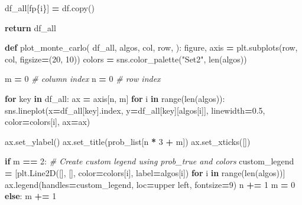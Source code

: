 \documentclass[
]{book}
\newenvironment{Shaded}{\begin{snugshade}}{\end{snugshade}}
\newcommand{\BuiltInTok}[1]{#1}
\newcommand{\CommentTok}[1]{\textcolor[rgb]{0.56,0.35,0.01}{\textit{#1}}}
\newcommand{\ControlFlowTok}[1]{\textcolor[rgb]{0.13,0.29,0.53}{\textbf{#1}}}
\newcommand{\DecValTok}[1]{\textcolor[rgb]{0.00,0.00,0.81}{#1}}
\newcommand{\FloatTok}[1]{\textcolor[rgb]{0.00,0.00,0.81}{#1}}
\newcommand{\KeywordTok}[1]{\textcolor[rgb]{0.13,0.29,0.53}{\textbf{#1}}}
\newcommand{\NormalTok}[1]{#1}
\newcommand{\OperatorTok}[1]{\textcolor[rgb]{0.81,0.36,0.00}{\textbf{#1}}}
\newcommand{\SpecialCharTok}[1]{\textcolor[rgb]{0.00,0.00,0.00}{#1}}
\newcommand{\SpecialStringTok}[1]{\textcolor[rgb]{0.31,0.60,0.02}{#1}}
\newcommand{\StringTok}[1]{\textcolor[rgb]{0.31,0.60,0.02}{#1}}
\theoremstyle{definition}
\theoremstyle{definition}
\theoremstyle{definition}
\theoremstyle{definition}
\theoremstyle{remark}
\begin{document}
\begin{Shaded}
\begin{Highlighting}[]
\NormalTok{        df\_all[}\SpecialStringTok{f\textquotesingle{}p}\SpecialCharTok{\{}\NormalTok{i}\SpecialCharTok{\}}\SpecialStringTok{\textquotesingle{}}\NormalTok{] }\OperatorTok{=}\NormalTok{ df.copy()}

    \ControlFlowTok{return}\NormalTok{ df\_all}


\KeywordTok{def}\NormalTok{ plot\_monte\_carlo(}
\NormalTok{        df\_all,}
\NormalTok{        algos,}
\NormalTok{        col,}
\NormalTok{        row,}
\NormalTok{):}
\NormalTok{    figure, axis }\OperatorTok{=}\NormalTok{ plt.subplots(row, col, figsize}\OperatorTok{=}\NormalTok{(}\DecValTok{20}\NormalTok{, }\DecValTok{10}\NormalTok{))}
\NormalTok{    colors }\OperatorTok{=}\NormalTok{ sns.color\_palette(}\StringTok{"Set2"}\NormalTok{, }\BuiltInTok{len}\NormalTok{(algos))}

\NormalTok{    m }\OperatorTok{=} \DecValTok{0}  \CommentTok{\# column index}
\NormalTok{    n }\OperatorTok{=} \DecValTok{0}  \CommentTok{\# row index}

    \ControlFlowTok{for}\NormalTok{ key }\KeywordTok{in}\NormalTok{ df\_all:}
\NormalTok{        ax }\OperatorTok{=}\NormalTok{ axis[n, m]}
        \ControlFlowTok{for}\NormalTok{ i }\KeywordTok{in} \BuiltInTok{range}\NormalTok{(}\BuiltInTok{len}\NormalTok{(algos)):}
\NormalTok{            sns.lineplot(x}\OperatorTok{=}\NormalTok{df\_all[key].index, y}\OperatorTok{=}\NormalTok{df\_all[key][algos[i]], linewidth}\OperatorTok{=}\FloatTok{0.5}\NormalTok{, color}\OperatorTok{=}\NormalTok{colors[i], ax}\OperatorTok{=}\NormalTok{ax)}

\NormalTok{        ax.set\_ylabel(}\StringTok{\textquotesingle{}\textquotesingle{}}\NormalTok{)}
\NormalTok{        ax.set\_title(prob\_list[n }\OperatorTok{*} \DecValTok{3} \OperatorTok{+}\NormalTok{ m])}
\NormalTok{        ax.set\_xticks([])}

        \ControlFlowTok{if}\NormalTok{ m }\OperatorTok{==} \DecValTok{2}\NormalTok{:}
            \CommentTok{\# Create custom legend using prob\_true and colors}
\NormalTok{            custom\_legend }\OperatorTok{=}\NormalTok{ [plt.Line2D([], [], color}\OperatorTok{=}\NormalTok{colors[i], label}\OperatorTok{=}\NormalTok{algos[i]) }\ControlFlowTok{for}\NormalTok{ i }\KeywordTok{in} \BuiltInTok{range}\NormalTok{(}\BuiltInTok{len}\NormalTok{(algos))]}
\NormalTok{            ax.legend(handles}\OperatorTok{=}\NormalTok{custom\_legend, loc}\OperatorTok{=}\StringTok{\textquotesingle{}upper left\textquotesingle{}}\NormalTok{, fontsize}\OperatorTok{=}\DecValTok{9}\NormalTok{)}
\NormalTok{            n }\OperatorTok{+=} \DecValTok{1}
\NormalTok{            m }\OperatorTok{=} \DecValTok{0}
        \ControlFlowTok{else}\NormalTok{:}
\NormalTok{            m }\OperatorTok{+=} \DecValTok{1}


\end{Highlighting}
\end{Shaded}
\end{document}

